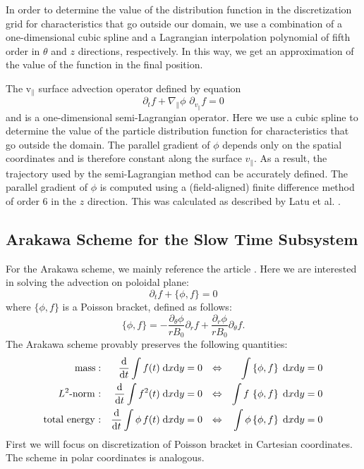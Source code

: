 In order to determine the value of the distribution function in the discretization grid for characteristics that go outside our domain, we use a combination of a one-dimensional cubic spline and a Lagrangian interpolation polynomial of fifth order in $\theta$ and $z$ directions, respectively. In this way, we get an approximation of the value of the function in the final position.

The v$_\parallel$ surface advection operator defined by equation
\begin{equation}
    \partial_t f + \nabla_\parallel \phi\,\, \partial_{v_{\parallel}} f = 0
\end{equation}
and is a one-dimensional semi-Lagrangian operator. Here we use a cubic spline to determine the value of the particle distribution function for characteristics that go outside the domain. The parallel gradient of $\phi$ depends only on the spatial coordinates and is therefore constant along the surface $v_\parallel$. As a result, the trajectory used by the semi-Lagrangian method can be accurately defined. The parallel gradient of $\phi$ is computed using a (field-aligned) finite difference method of order 6 in the $z$ direction. This was calculated as described by Latu et al. \cite{Latu_2017}.





\subsection{Arakawa Scheme for the Slow Time Subsystem}

For the Arakawa scheme, we mainly reference the article \cite{Arakawa_1966}. Here we are interested in solving the advection on poloidal plane:
\begin{equation}
 \partial_t f + \{\phi, f\} = 0
\end{equation}
where $\{\phi,f\}$ is a Poisson bracket, defined as follows:
\begin{equation}
 \{\phi,f\}=-\frac{\partial_\theta\phi}{rB_0}\partial_r f + \frac{\partial_r\phi}{rB_0}\partial_\theta f.
\end{equation}
The Arakawa scheme provably preserves the following quantities: %
	\begin{align*}
		\text{mass} : && \frac{\text{d}}{\text{d} t} \int f(t) \;\text{d} x \text{d} y & = 0 & \Leftrightarrow && \int\left\{ \phi, f \right\} \;\text{d} x \text{d} y & = 0 \\
		L^2\text{-norm :} && \frac{\text{d}}{\text{d} t} \int f^2(t) \;\text{d} x \text{d} y & = 0 & \Leftrightarrow && \int f \, \left\{ \phi, f \right\} \;\text{d} x \text{d} y & = 0 \\
		\text{total energy :} && \frac{\text{d}}{\text{d} t} \int \phi \, f(t) \;\text{d} x \text{d} y & = 0 & \Leftrightarrow && \int \phi \left\{ \phi, f \right\} \;\text{d} x \text{d} y & = 0
	\end{align*}
First we will focus on discretization of Poisson bracket in Cartesian coordinates. The scheme in polar coordinates is analogous.





